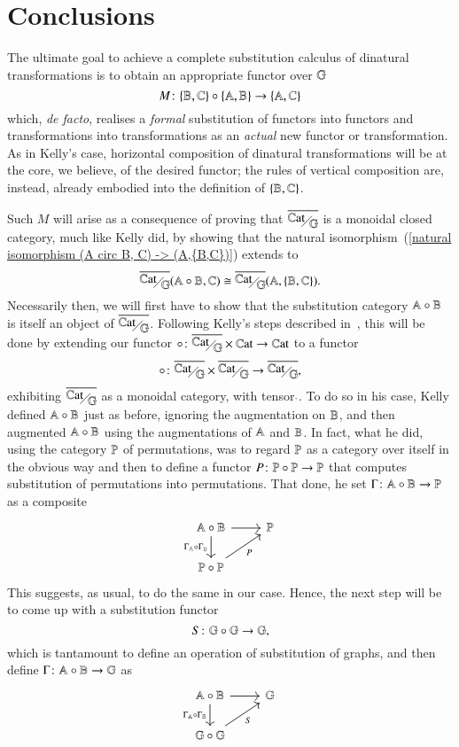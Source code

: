 \section{Conclusions}\label{section:coda}

The ultimate goal to achieve a complete substitution calculus of dinatural transformations is to obtain an appropriate functor over $\mathbb G$
\[
M \colon \{ \mathbb B,\mathbb C\} \circ \{ \mathbb A,\mathbb B\} \to \{ \mathbb A,\mathbb C\}
\]
which, \emph{de facto}, realises a \emph{formal} substitution of functors into functors and transformations into transformations as an \emph{actual} new functor or transformation. As in Kelly's case, {horizontal} composition of dinatural transformations will be at the core, we believe, of the desired functor; the rules of vertical composition are, instead, already embodied into the definition of $\{ \mathbb B,\mathbb C\}$.

Such $M$ will arise as a consequence of proving that $\WCFover\gcf$ is a monoidal closed category, much like Kelly did, by showing that the natural isomorphism~(\ref{natural isomorphism (A circ B, C) -> (A,{B,C})}) extends to
\[
\WCFover\gcf (\ring \A \B , \C) \cong \WCFover\gcf (\A , \FC \B \C).
\]
Necessarily then, we will first have to show that the substitution category $\mathbb A \circ \mathbb B$ is itself an object of $\WCFover\gcf$. Following Kelly's steps described in~\cite[\S 2.1]{kelly_many-variable_1972}, this will be done by extending our functor $\ring{}{} \colon \WCFover\gcf \times \Cat \to \Cat$ to a functor
\[
\ring{}{} \colon \WCFover\gcf \times \WCFover\gcf \to \WCFover\gcf,
\]
exhibiting $\WCFover\gcf$ as a monoidal category, with tensor $\ring{}{}$. 
To do so in his case, Kelly defined $\mathbb A \circ \mathbb B$ just as before, ignoring the augmentation on $\mathbb B$, and then augmented $\mathbb A \circ \mathbb B$ using the augmentations of $\mathbb A$ and $\mathbb B$. In fact, what he did, using the category $\mathbb P$ of permutations, was to regard $\mathbb P$ as a category over itself in the obvious way and then to define a functor $P \colon \mathbb P \circ \mathbb P \to \mathbb P$ that computes substitution of permutations into permutations. That done, he set $\Gamma \colon \mathbb A \circ \mathbb B \to \mathbb P$ as a composite
\[
\begin{tikzcd}
\ring \A \B \ar[d,"\ring {\Gamma_\A} {\Gamma_\B}"'] \ar[r] & \Per \\
\ring \Per \Per \ar[ur,"P"']
\end{tikzcd}
\]
This suggests, as usual, to do the same in our case. Hence, the next step will be to come up with a substitution functor
\[
S \colon \mathbb G \circ \mathbb G \to \mathbb G,
\]
which is tantamount to define an operation of substitution of graphs, and then define $\Gamma \colon \mathbb A \circ \mathbb B \to \mathbb G$ as
\begin{equation}\label{augmentation of A ring B via G ring G}
\begin{tikzcd}
\ring \A \B \ar[d,"\ring {\Gamma_\A} {\Gamma_\B}"'] \ar[r] & \gcf\\
\ring \gcf \gcf \ar[ur,"S"']
\end{tikzcd}
\end{equation}

